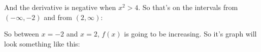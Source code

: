 \documentclass[pdftex, brazil, 12pt, twoside]{article}
\begin{document}
\begin{figure}[H]
  \begin{center}
  \end{center}
\end{figure}

And the derivative is negative when
$x^2 > 4$.
So that's on the intervals from $(-\infty, -2)$
and from $(2, \infty)$:

\begin{figure}[H]
  \begin{center}
  \end{center}
\end{figure}

So between $x = -2$ and $x = 2$,
$f(x)$ is going to be increasing. So it's graph will look something like this:

\begin{figure}[H]
  \begin{center}
  \end{center}
\end{figure}
\end{document}
